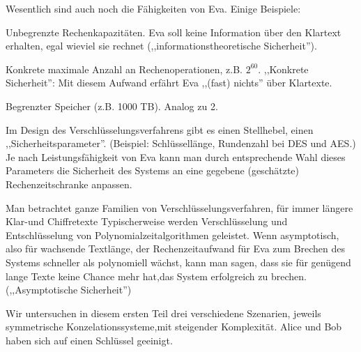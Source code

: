 \documentclass[a4paper]{article}
\begin{document}
\begin{multicols}{3}
    Wesentlich sind auch noch die Fähigkeiten von Eva. Einige Beispiele:
    \begin{enumerate*}
        \item Unbegrenzte Rechenkapazitäten. Eva soll keine Information über den Klartext erhalten, egal wieviel sie rechnet (,,informationstheoretische Sicherheit'').
        \item  Konkrete maximale Anzahl an Rechenoperationen, z.B. $2^{60}$. ,,Konkrete Sicherheit'': Mit diesem Aufwand erfährt Eva ,,(fast) nichts'' über Klartexte.
        \item  Begrenzter Speicher (z.B. 1000 TB). Analog zu 2.
        \item Im Design des Verschlüsselungsverfahrens gibt es einen Stellhebel, einen ,,Sicherheitsparameter''. (Beispiel: Schlüssellänge, Rundenzahl bei DES und AES.) Je nach Leistungsfähigkeit von Eva kann man durch entsprechende Wahl dieses Parameters die Sicherheit des Systems an eine gegebene (geschätzte) Rechenzeitschranke anpassen.
        \item  Man betrachtet ganze Familien von Verschlüsselungsverfahren, für immer längere Klar-und Chiffretexte Typischerweise werden Verschlüsselung und Entschlüsselung von Polynomialzeitalgorithmen geleistet. Wenn asymptotisch, also für wachsende Textlänge, der Rechenzeitaufwand für Eva zum Brechen des Systems schneller als polynomiell wächst, kann man sagen, dass sie für genügend lange Texte keine Chance mehr hat,das System erfolgreich zu brechen. (,,Asymptotische Sicherheit'')
    \end{enumerate*}

    Wir untersuchen in diesem ersten Teil drei verschiedene Szenarien, jeweils symmetrische Konzelationssysteme,mit steigender Komplexität. Alice und Bob haben sich auf einen Schlüssel geeinigt.


\end{multicols}
\end{document}

